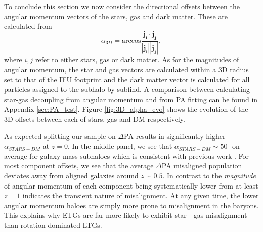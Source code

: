 \documentclass[fleqn,usenatbib]{mnras}
\begin{document}
To conclude this section we now consider the directional offsets between the angular momentum vectors of the stars, gas and dark matter. These are calculated from
\begin{equation} \label{eq:alpha}
    \alpha_{3D} = \text{arccos} \frac{\boldsymbol{j_{i}} \cdot \boldsymbol{j_{j}}}{\left| \boldsymbol{j_{i}} \right| \left| \boldsymbol{j_{j}} \right|},
\end{equation}
where $i, j$ refer to either stars, gas or dark matter. As for the magnitudes of angular momentum, the star and gas vectors are calculated within a 3D radius set to that of the IFU footprint and the dark matter vector is calculated for all particles assigned to the subhalo by subfind. A comparison between calculating star-gas decoupling from angular momentum and from PA fitting can be found in Appendix \ref{sec:PA_test}. Figure \ref{fig:3D_alpha_evo} shows the evolution of the 3D offsets between each of stars, gas and DM respectively. 

As expected splitting our sample on $\Delta$PA results in significantly higher $\alpha_{STARS - DM}$ at $z = 0$. In the middle panel, we see that $\alpha_{STARS - DM} \sim 50^{\circ}$ on average for galaxy mass subhaloes which is consistent with previous work \citep[e.g. see;][]{chisari+17}. For most component offsets, we see that the average $\Delta$PA misaligned population deviates away from aligned galaxies around $z \sim 0.5$. In contrast to the \textit{magnitude} of angular momentum of each component being systematically lower from at least $z = 1$ indicates the transient nature of misalignment. At any given time, the lower angular momentum haloes are simply more prone to misalignment in the baryons. This explains why ETGs are far more likely to exhibit star - gas misalignment than rotation dominated LTGs. 
\end{document}

